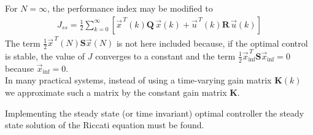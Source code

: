 \documentclass[12pt,a4paper,oneside]{book}
\begin{document}
\begin{onehalfspace}
For $N=\infty$, the performance index may be modified to 
\begin{equation}\label{optimal_control_ss_eq2}
	\begin{aligned}
		J_{ss} = \frac{1}{2}\sum_{k=0}^{\infty}\left[ 
		\vec{x}^{\,T}(k)\mathbf{Q}\,\vec{x}(k) + 
		\vec{u}^{\,T}(k)\mathbf{R}\,\vec{u}(k)\right]
	\end{aligned}
\end{equation}
The term $\frac{1}{2}\vec{x}^{\,T}(N)\mathbf{S}\vec{x}(N)$ is not here included 
because, if the optimal control is stable, the value of $J$ converges to a 
constant and the term 
$\frac{1}{2}\vec{x}^{\,T}_{\inf}\mathbf{S}\vec{x}_{\inf}=0$ because 
$\vec{x}_{\inf}=0$.\\

In many practical systems, instead of using a time-varying gain matrix 
$\mathbf{K}(k)$ we approximate such a matrix by the constant gain matrix 
$\mathbf{K}$.

Implementing the steady state (or time invariant) optimal controller the steady 
state solution of the Riccati equation must be found.   


\end{onehalfspace}
\end{document}
